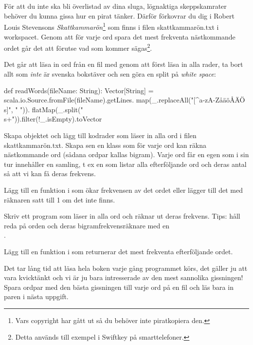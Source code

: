 \\
\noindent \\
För att du inte ska bli överlistad av dina sluga, lögnaktiga skeppskamrater behöver du kunna gissa hur en pirat tänker. Därför förkovrar du dig i Robert Louis Stevensons \emph{Skattkammarön}\footnote{Vars copyright har gått ut så du behöver inte piratkopiera den.} som finns i filen skattkammarön.txt i workspacet.  Genom att för varje ord spara det mest frekventa nästkommande ordet går det att förutse vad som kommer sägas\footnote{Detta används till exempel i Swiftkey på smarttelefoner.}. 

\Subtask Det går att läsa in ord från en fil med  genom att först läsa in alla rader, ta bort allt som {\em inte} är svenska bokstäver och sen göra en split på \emph{white space}: 
\begin{Code}
def readWords(fileName: String): Vector[String] = {
	   scala.io.Source.fromFile(fileName).getLines.
	   map(_.replaceAll("[^a-zA-ZåäöÅÄÖ\\s]", " ")).
	   flatMap(_.split("\\s+")).filter(!_.isEmpty).toVector
	}
\end{Code}

Skapa objektet  och lägg till kodrader som läser in alla ord i filen skattkammarön.txt. Skapa sen en klass  som för varje ord kan räkna nästkommande ord (sådana ordpar kallas bigram). Varje ord får en egen  som i sin tur innehåller en samling, t ex en  som listar alla efterföljande ord och deras antal så att vi kan få deras frekvens.

\Subtask Lägg till en funktion  i  som ökar frekvensen av det ordet  eller lägger till det med räknaren satt till 1 om det inte finns. 

\Subtask Skriv ett program som läser in alla ord och räknar ut deras frekvens. Tips: håll reda på orden och deras bigramfrekvensräknare med en \\
.

\Subtask Lägg till en funktion  i  som returnerar det mest frekventa efterföljande ordet. 

\Subtask Det tar lång tid att läsa hela boken varje gång programmet körs, det gäller ju att vara kvicktänkt och vi är ju bara intresserade av den mest sannolika gissningen! Spara ordpar  med den bästa gissningen till varje ord på en fil och läs bara in paren i nästa uppgift. 

